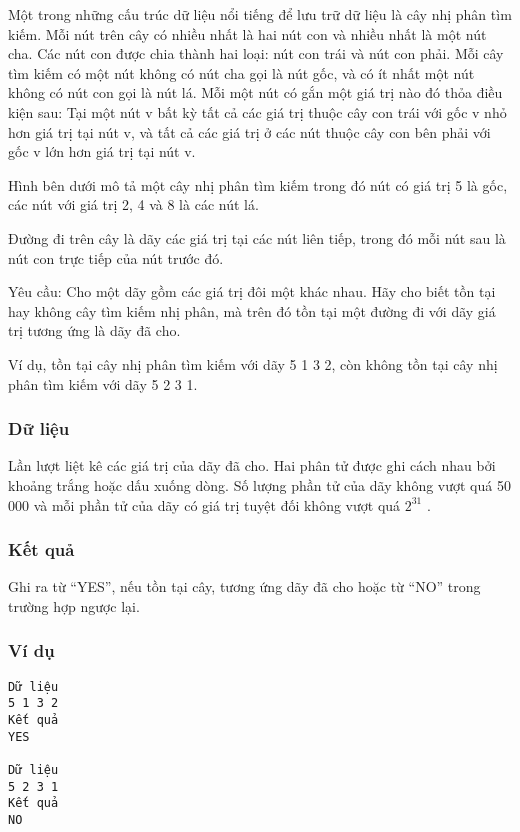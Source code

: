



   Một trong những cấu trúc dữ liệu nổi tiếng để lưu trữ dữ liệu là cây nhị phân tìm kiếm. Mỗi nút trên cây có nhiều nhất là hai nút con và nhiều nhất là một nút cha. Các nút con được chia thành hai loại: nút con trái và nút con phải. Mỗi cây tìm kiếm có một nút không có nút cha gọi là nút gốc, và có ít nhất một nút không có nút con gọi là nút lá. Mỗi một nút có gắn một giá trị nào đó thỏa điều kiện sau: Tại một nút v bất kỳ tất cả các giá trị thuộc cây con trái với gốc v nhỏ hơn giá trị tại nút v, và tất cả các giá trị ở các nút thuộc cây con bên phải với gốc v lớn hơn giá trị tại nút v.  

   Hình bên dưới mô tả một cây nhị phân tìm kiếm trong đó nút có giá trị 5 là gốc, các nút với giá trị 2, 4 và 8 là các nút lá.  

   Đường đi trên cây là dãy các giá trị tại các nút liên tiếp, trong đó mỗi nút sau là nút con trực tiếp của nút trước đó.  

   Yêu cầu: Cho một dãy gồm các giá trị đôi một khác nhau. Hãy cho biết tồn tại hay không cây tìm kiếm nhị phân, mà trên đó tồn tại một đường đi với dãy giá trị tương ứng là dãy đã cho.  

   Ví dụ, tồn tại cây nhị phân tìm kiếm với dãy 5 1 3 2, còn không tồn tại cây nhị phân tìm kiếm với dãy 5 2 3 1.  

\subsubsection{   Dữ liệu  }

   Lần lượt liệt kê các giá trị của dãy đã cho. Hai phân tử được ghi cách nhau bởi khoảng trắng hoặc dấu xuống dòng. Số lượng phần tử của dãy không vượt quá 50 000 và mỗi phần tử của dãy có giá trị tuyệt đối không vượt quá $2^{31}$   .  

\subsubsection{   Kết quả  }

   Ghi ra từ “YES”, nếu tồn tại cây, tương ứng dãy đã cho hoặc từ “NO” trong trường hợp ngược lại.  

\subsubsection{   Ví dụ  }
\begin{verbatim}
Dữ liệu
5 1 3 2	
Kết quả
YES

Dữ liệu
5 2 3 1	
Kết quả
NO
\end{verbatim}
